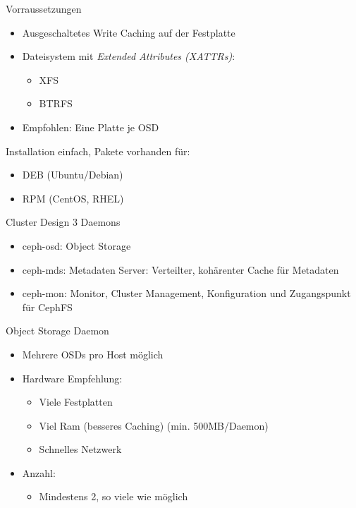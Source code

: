 \documentclass[hyperref={xetex}]{beamer}
\begin{document}
\begin{frame}{Vorraussetzungen}
	\begin{itemize}
		\item Ausgeschaltetes Write Caching auf der Festplatte
		\item Dateisystem mit \emph{Extended Attributes (XATTRs)}:
		\begin{itemize}
			\item XFS
			\item BTRFS
		\end{itemize}
		\item Empfohlen: Eine Platte je OSD

	\end{itemize}
	Installation einfach, Pakete vorhanden f\"ur:
	\begin{itemize}
		\item DEB (Ubuntu/Debian)
		\item RPM (CentOS, RHEL)
	\end{itemize}
\end{frame}




\begin{frame}{Cluster Design}
	3 Daemons
	\begin{itemize}
        \item \alert{ceph-osd}: Object Storage
        \item \alert{ceph-mds}: Metadaten Server: Verteilter, koh\"arenter Cache f\"ur Metadaten %
        \item \alert{ceph-mon}: Monitor, Cluster Management, Konfiguration und Zugangspunkt f\"ur CephFS
	\end{itemize}
\end{frame}


\begin{frame}{Object Storage Daemon}
	\begin{itemize}
		\item Mehrere OSDs pro Host m\"oglich
		\item Hardware Empfehlung:
		\begin{itemize}
			\item Viele Festplatten 
			\item Viel Ram (besseres Caching) (min. 500MB/Daemon)
			\item Schnelles Netzwerk
		\end{itemize}
		\item Anzahl:
		\begin{itemize}
			\item Mindestens 2, so viele wie m\"oglich
		\end{itemize}
	\end{itemize}
\end{frame}
\end{document}
